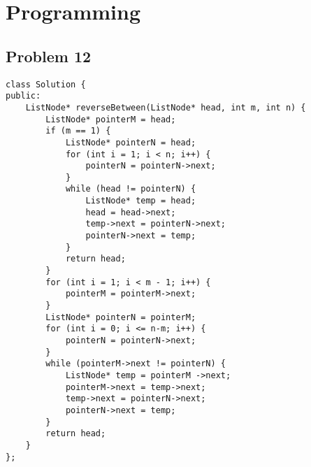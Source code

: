 \documentclass[11pt]{article}
\theoremstyle{remark}
\begin{document}
\section{Programming}
\subsection{Problem 12}
\begin{lstlisting}
class Solution {
public:
    ListNode* reverseBetween(ListNode* head, int m, int n) {
        ListNode* pointerM = head;
        if (m == 1) {
            ListNode* pointerN = head;
            for (int i = 1; i < n; i++) {
                pointerN = pointerN->next;
            }
            while (head != pointerN) {
                ListNode* temp = head;
                head = head->next;
                temp->next = pointerN->next;
                pointerN->next = temp;
            }
            return head;
        }
        for (int i = 1; i < m - 1; i++) {
            pointerM = pointerM->next;
        }
        ListNode* pointerN = pointerM;
        for (int i = 0; i <= n-m; i++) {
            pointerN = pointerN->next;
        }
        while (pointerM->next != pointerN) {
            ListNode* temp = pointerM ->next;
            pointerM->next = temp->next;
            temp->next = pointerN->next;
            pointerN->next = temp;
        }
        return head;
    }
};
\end{lstlisting}
\end{document}
